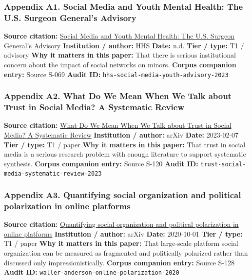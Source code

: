 \documentclass[
  american,
  11pt,
  letterpaper,
]{article}
\begin{document}
\subsubsection{Appendix A1. Social Media and Youth Mental Health: The
U.S. Surgeon General's
Advisory}\label{appendix-a1-social-media-and-youth-mental-health-the-u-s-surgeon-general-s-advisory}

\textbf{Source citation:}
\href{https://www.hhs.gov/surgeongeneral/priorities/youth-mental-health/social-media/index.html}{Social
Media and Youth Mental Health: The U.S. Surgeon General's Advisory}
\textbf{Institution / author:} HHS \textbf{Date:} n.d. \textbf{Tier /
type:} T1 / advisory \textbf{Why it matters in this paper:} That there
is serious institutional concern about the impact of social networks on
minors. \textbf{Corpus companion entry:} Source S-069 \textbf{Audit ID:}
\texttt{hhs-social-media-youth-advisory-2023}

\subsubsection{Appendix A2. What Do We Mean When We Talk about Trust in
Social Media? A Systematic
Review}\label{appendix-a2-what-do-we-mean-when-we-talk-about-trust-in-social-media-a-systematic-review}

\textbf{Source citation:} \href{https://arxiv.org/abs/2302.03671}{What
Do We Mean When We Talk about Trust in Social Media? A Systematic
Review} \textbf{Institution / author:} arXiv \textbf{Date:} 2023-02-07
\textbf{Tier / type:} T1 / paper \textbf{Why it matters in this paper:}
That trust in social media is a serious research problem with enough
literature to support systematic synthesis. \textbf{Corpus companion
entry:} Source S-120 \textbf{Audit ID:}
\texttt{trust-social-media-systematic-review-2023}

\subsubsection{Appendix A3. Quantifying social organization and
political polarization in online
platforms}\label{appendix-a3-quantifying-social-organization-and-political-polarization-in-online-platforms}

\textbf{Source citation:}
\href{https://arxiv.org/abs/2010.00590}{Quantifying social organization
and political polarization in online platforms} \textbf{Institution /
author:} arXiv \textbf{Date:} 2020-10-01 \textbf{Tier / type:} T1 /
paper \textbf{Why it matters in this paper:} That large-scale platform
social organization can be measured as fragmented and politically
polarized rather than discussed only impressionistically. \textbf{Corpus
companion entry:} Source S-128 \textbf{Audit ID:}
\texttt{waller-anderson-online-polarization-2020}
\end{document}
